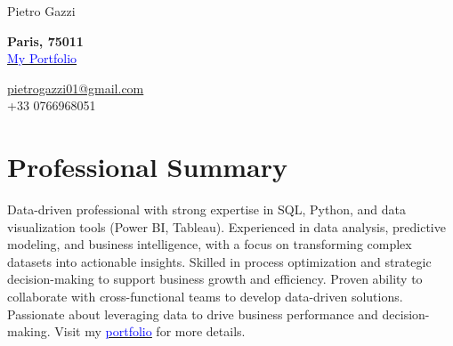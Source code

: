 \documentclass[letterpaper,10.5pt]{article}
\begin{document}
\begin{center}\vspace{-10pt}
    {\LARGE Pietro Gazzi}\\\vspace{-11pt}
        \begin{multicols}{2}
        \begin{flushleft}
            \textbf{Paris, 75011}\\
            \href{https://pietrowei.github.io/Portfolio}{\underline{\textcolor{blue}{My Portfolio}}}
        \end{flushleft}
        \begin{flushright}
            \href{mailto:pietrogazzi01@gmail.com}{pietrogazzi01@gmail.com}\\
            +33 0766968051
        \end{flushright}
    \end{multicols}
\end{center}

\section*{Professional Summary}
Data-driven professional with strong expertise in SQL, Python, and data visualization tools (Power BI, Tableau). Experienced in data analysis, predictive modeling, and business intelligence, with a focus on transforming complex datasets into actionable insights. Skilled in process optimization and strategic decision-making to support business growth and efficiency. Proven ability to collaborate with cross-functional teams to develop data-driven solutions. Passionate about leveraging data to drive business performance and decision-making. Visit my \href{https://pietrowei.github.io/Portfolio}{\underline{\textcolor{blue}{portfolio}}} for more details.
\end{document}

